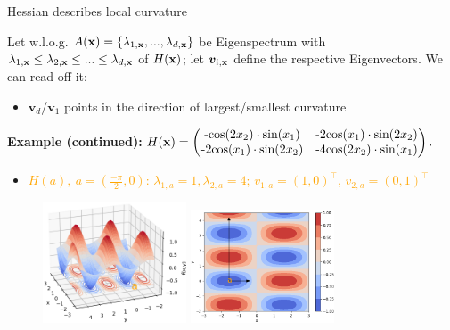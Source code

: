 \documentclass[11pt,compress,t,notes=noshow, xcolor=table]{beamer}
\begin{document}
\begin{vbframe}{Hessian describes local curvature} 

\begin{footnotesize}

Let w.l.o.g. $A(\mathbf{x}) = \{\lambda_{1, \mathbf{x}}, ..., \lambda_{d, \mathbf{x}}\}$ be Eigenspectrum with $\lambda_{1, \mathbf{x}} \le \lambda_{2, \mathbf{x}} \le ... \le \lambda_{d, \mathbf{x}}$ of $H(\mathbf{x})$; let $\bm{v}_{i, \mathbf{x}}$ define the respective Eigenvectors. We can read off it: 

\begin{itemize}
  \item $\bm{v}_d$/$\bm{v}_1$ points in the direction of largest/smallest curvature
\end{itemize}

\vspace*{0.1cm}



\textbf{Example (continued):} $H(\mathbf{x}) = \begin{pmatrix}
\text{-cos}(2x_2)\cdot\text{sin}(x_1) & \text{-2cos}(x_1)\cdot\text{sin}(2x_2) 
\\ \text{-2cos}(x_1)\cdot\text{sin}(2x_2) & \text{-4cos}(2x_2)\cdot\text{sin}(x_1) 
\end{pmatrix}.
$

\begin{itemize}
  \item \textcolor{orange}{$H(a),~ a=(\frac{-\pi}{2},0)$: $\lambda_{1,a}=1, \lambda_{2,a}=4$; $v_{1,a} = (1, 0)^\top$, $v_{2,a} = (0, 1)^\top$}
\end{itemize}

\end{footnotesize}

\vspace*{0.05cm}

\begin{figure}[!tbp]
    \includegraphics[width=0.38\textwidth]{figure_man/hessian_3d.png}
    \hspace{0.5cm}
    \includegraphics[width=0.38\textwidth]{figure_man/hessian_contour.png}
\end{figure} 

\end{vbframe}




\endlecture
\end{document}
